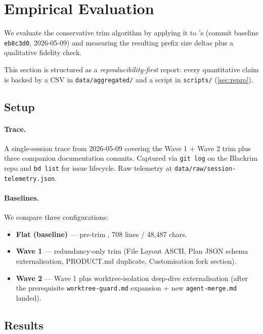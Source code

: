 \section{Empirical Evaluation}
\label{sec:eval}

We evaluate the conservative trim algorithm by applying it to
\blackrim's \claudemd (commit baseline \texttt{eb8c3d0},
2026-05-09) and measuring the resulting prefix size deltas plus a
qualitative fidelity check.

This section is structured as a \emph{reproducibility-first} report:
every quantitative claim is backed by a CSV in
\texttt{data/aggregated/} and a script in \texttt{scripts/}
(\cref{sec:repro}).

\subsection{Setup}

\paragraph{Trace.}
A single-session trace from 2026-05-09 covering the Wave 1 + Wave 2
trim plus three companion documentation commits. Captured via
\texttt{git log} on the Blackrim repo and \texttt{bd list} for issue
lifecycle. Raw telemetry at \texttt{data/raw/session-telemetry.json}.

\paragraph{Baselines.}
We compare three configurations:
\begin{itemize}
  \item \textbf{Flat (baseline)} — pre-trim \claudemd, 708 lines /
    48{,}487 chars.
  \item \textbf{Wave 1} — redundancy-only trim (File Layout ASCII,
    Plan JSON schema externalisation, PRODUCT.md duplicate, Customisation
    fork section).
  \item \textbf{Wave 2} — Wave 1 plus worktree-isolation deep-dive
    externalisation (after the prerequisite \texttt{worktree-guard.md}
    expansion + new \texttt{agent-merge.md} landed).
\end{itemize}

\subsection{Results}

